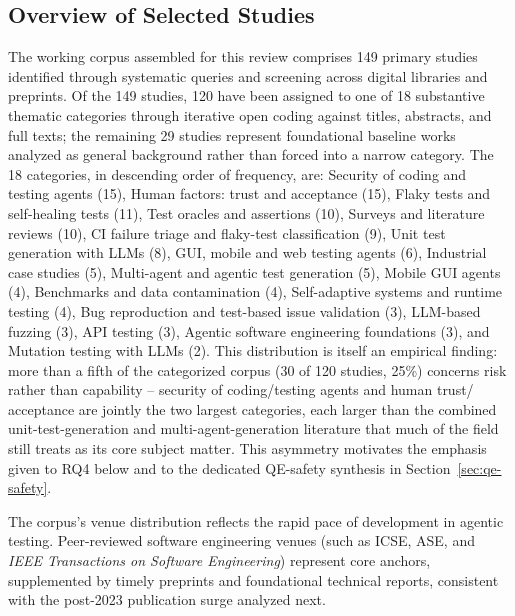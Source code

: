 %

\subsection{Overview of Selected Studies}
\label{subsec:corpus-overview}

The working corpus assembled for this review comprises 149 primary
studies identified through systematic queries and screening across digital
libraries and preprints.
Of the 149 studies, 120 have been assigned to
one of 18 substantive thematic categories through iterative open
coding against titles, abstracts, and full texts;
the remaining 29 studies represent foundational baseline works
analyzed as general background rather than forced into a narrow category.
The 18 categories, in descending order of frequency, are: Security of coding
and testing agents (15), Human factors: trust and acceptance (15),
Flaky tests and self-healing tests (11), Test oracles and assertions
(10), Surveys and literature reviews (10), CI failure triage and
flaky-test classification (9), Unit test generation with LLMs (8),
GUI, mobile and web testing agents (6), Industrial case studies (5),
Multi-agent and agentic test generation (5), Mobile GUI agents (4),
Benchmarks and data contamination (4), Self-adaptive systems and
runtime testing (4), Bug reproduction and test-based issue validation
(3), LLM-based fuzzing (3), API testing (3), Agentic software
engineering foundations (3), and Mutation testing with LLMs (2). This
distribution is itself an empirical finding: more than a fifth of the
categorized corpus (30 of 120 studies, 25\%) concerns risk rather than
capability -- security of coding/testing agents and human trust/
acceptance are jointly the two largest categories, each larger than
the combined unit-test-generation and multi-agent-generation
literature that much of the field still treats as its core subject
matter. This asymmetry motivates the emphasis given to RQ4 below and
to the dedicated QE-safety synthesis in Section~\ref{sec:qe-safety}.

The corpus's venue distribution reflects the rapid pace of development in
agentic testing. Peer-reviewed software engineering venues (such as ICSE,
ASE, and \emph{IEEE Transactions on Software Engineering}) represent core
anchors, supplemented by timely preprints and foundational technical reports,
consistent with the post-2023 publication surge analyzed next.

